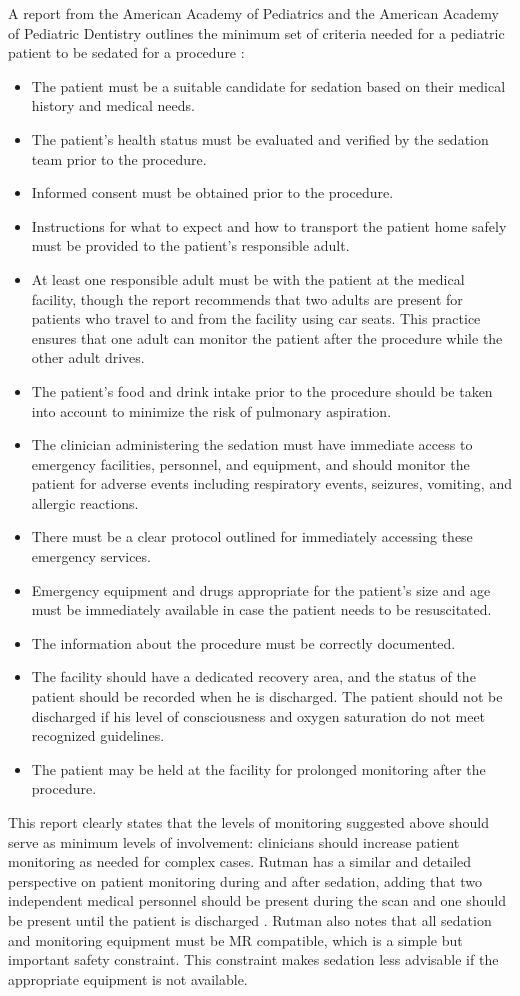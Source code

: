 A report from the American Academy of Pediatrics and the American Academy of Pediatric Dentistry outlines the minimum set of criteria needed for a pediatric patient to be sedated for a procedure \cite{Cote2016}:
\begin{itemize}
\item The patient must be a suitable candidate for sedation based on their medical history and medical needs.
\item The patient's health status must be evaluated and verified by the sedation team prior to the procedure.
\item Informed consent must be obtained prior to the procedure.
\item Instructions for what to expect and how to transport the patient home safely must be provided to the patient's responsible adult.
\item At least one responsible adult must be with the patient at the medical facility, though the report recommends that two adults are present for patients who travel to and from the facility using car seats. This practice ensures that one adult can monitor the patient after the procedure while the other adult drives.
\item The patient's food and drink intake prior to the procedure should be taken into account to minimize the risk of pulmonary aspiration.
\item The clinician administering the sedation must have immediate access to emergency facilities, personnel, and equipment, and should monitor the patient for adverse events including respiratory events, seizures, vomiting, and allergic reactions.
\item There must be a clear protocol outlined for immediately accessing these emergency services.
\item Emergency equipment and drugs appropriate for the patient's size and age must be immediately available in case the patient needs to be resuscitated.
\item The information about the procedure must be correctly documented.
\item The facility should have a dedicated recovery area, and the status of the patient should be recorded when he is discharged. The patient should not be discharged if his level of consciousness and oxygen saturation do not meet recognized guidelines.
\item The patient may be held at the facility for prolonged monitoring after the procedure.
\end{itemize}
\noindent This report clearly states that the levels of monitoring suggested above should serve as minimum levels of involvement: clinicians should increase patient monitoring as needed for complex cases. Rutman has a similar and detailed perspective on patient monitoring during and after sedation, adding that two independent medical personnel should be present during the scan and one should be present until the patient is discharged \cite{Rutman2009}. Rutman also notes that all sedation and monitoring equipment must be MR compatible, which is a simple but important safety constraint. This constraint makes sedation less advisable if the appropriate equipment is not available.

